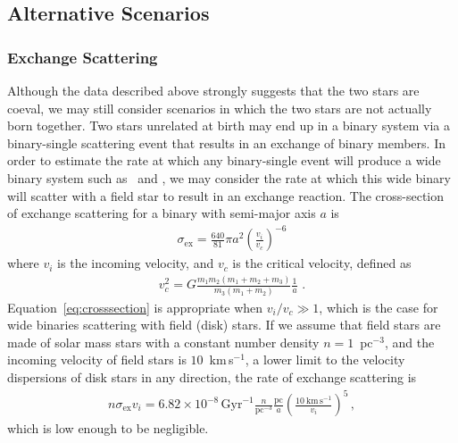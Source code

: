 \documentclass[12pt,letterpaper,margin=1in]{article}
\newcommand{\eqname}{Equation}
\newcommand{\sunanalog}{\text{Krios}}
\newcommand{\bizarreone}{\text{Kronos}}
\begin{document}
\subsection{Alternative Scenarios}

\subsubsection{Exchange Scattering}
\label{sub:exchange_scattering}

Although the data described above strongly suggests that the two stars are
coeval, we may still consider scenarios in which the two stars are not actually
born together.
Two stars unrelated at birth may end up in a binary system via a binary-single
scattering event that results in an exchange of binary members.
In order to estimate the rate at which any binary-single
event will produce a wide binary system such as \sunanalog\ and \bizarreone,
we may consider the rate at which this wide binary will scatter with a field star to
result in an exchange reaction.
The cross-section of exchange scattering for a binary with semi-major axis $a$ is
\cite{Hut:1983ab,Hut:1983aa}
\begin{eqnarray}
  \sigma_\mathrm{ex} = \frac{640}{81} \pi a^{2} \left(\frac{v_i}{v_c}\right)^{-6}
  \label{eq:crosssection}
\end{eqnarray}
where $v_i$ is the incoming velocity, and $v_c$ is the critical velocity,
defined as
\begin{eqnarray}
  v_c^2 = G \frac{m_1 m_2 (m_1 + m_2 + m_3)}{m_3 (m_1 + m_2)} \frac{1}{a}\,\,.
\end{eqnarray}
\eqname~\ref{eq:crosssection} is appropriate when $v_i/v_c \gg 1$,
which is the case for wide binaries
scattering with field (disk) stars.
If we assume that field stars are made of solar mass stars with a constant
number density $n=1$~pc$^{-3}$, and the incoming velocity of field stars is
$10$~km\,s$^{-1}$, a lower limit to the velocity dispersions of disk stars in
any direction, the rate of exchange scattering is
\begin{eqnarray}
  n \sigma_\mathrm{ex} v_i = 6.82\times 10^{-8}\,\mathrm{Gyr}^{-1}
  \frac{n}{\mathrm{pc}^{-3}} \frac{\mathrm{pc}}{a}
  \left(\frac{10~\mathrm{km}\,\mathrm{s}^{-1}}{v_i}\right)^5\,,
\end{eqnarray}
which is low enough to be negligible.
\end{document}
